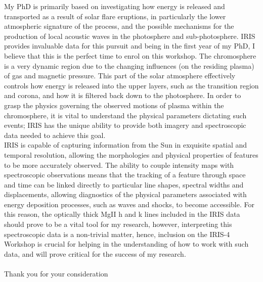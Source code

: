 \documentclass[10pt]{article}
\begin{document}
My PhD is primarily based on investigating how energy is released and transported as a result of solar flare eruptions, in particularly the lower atmospheric signature of the process, and the possible mechanisms for the production of local acoustic waves in the photosphere and sub-photosphere. IRIS provides invaluable data for this pursuit and being in the first year of my PhD, I believe that this is the perfect time to enrol on this workshop. The chromosphere is a very dynamic region due to the changing influences (on the residing plasma) of gas and magnetic pressure. This part of the solar atmosphere effectively controls how energy is released into the upper layers, such as the transition region and corona, and how it is filtered back down to the photosphere. In order to grasp the physics governing the observed motions of plasma within the chromosphere, it is vital to understand the physical parameters dictating such events; IRIS has the unique ability to provide both imagery and spectroscopic data needed to achieve this goal. \\

IRIS is capable of capturing information from the Sun in exquisite spatial and temporal resolution, allowing the morphologies and physical properties of features to be more accurately observed. The ability to couple intensity maps with spectroscopic observations means that the tracking of a feature through space and time can be linked directly to particular line shapes, spectral widths and displacements, allowing diagnostics of the physical parameters associated with energy deposition processes, such as waves and shocks, to become accessible. For this reason, the optically thick MgII h and k lines included in the IRIS data should prove to be a vital tool for my research, however, interpreting this spectroscopic data is a non-trivial matter, hence, inclusion on the IRIS-4 Workshop is crucial for helping in the understanding of how to work with such data, and will prove critical for the success of my research.\\
\\

Thank you for your consideration



  
\end{document}

